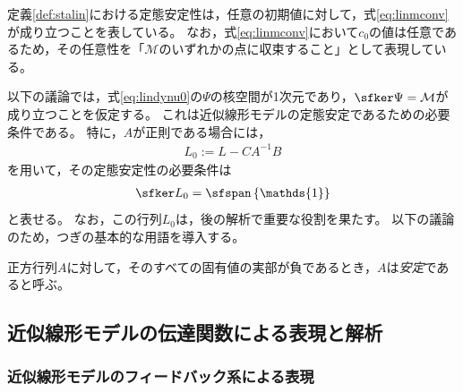\documentclass[tombow,dvipdfmx]{corona-a5}
\begin{document}
定義\ref{def:stalin}における定態安定性は，任意の初期値に対して，式\ref{eq:linmconv}が成り立つことを表している。
なお，式\ref{eq:linmconv}において$c_0$の値は任意であるため，その任意性を「$\mathcal{M}$のいずれかの点に収束すること」として表現している。

以下の議論では，式\ref{eq:lindynu0}の$\Psi$の核空間が1次元であり，$\sfker \Psi = \mathcal{M}$が成り立つことを仮定する。
これは近似線形モデルの定態安定であるための必要条件である。
特に，$A$が正則である場合には，
\begin{align}\label{eq:defL0}
L_0:= L-CA^{-1}B 
\end{align}
を用いて，その定態安定性の必要条件は
\begin{align}\label{eq:nescon}
\sfker L_0 = \sfspan
\left\{
\mathds{1}
\right\}
\end{align}
と表せる。
なお，この行列$L_0$は，後の解析で重要な役割を果たす。
以下の議論のため，つぎの基本的な用語を導入する。

\begin{定義}[正方行列の安定性]
\label{def:matsta}
正方行列$A$に対して，そのすべての固有値の実部が負であるとき，$A$は\emph{安定}であると呼ぶ。
\end{定義}



\subsection{近似線形モデルの伝達関数による表現と解析\advanced}

\subsubsection{近似線形モデルのフィードバック系による表現}
\end{document}
